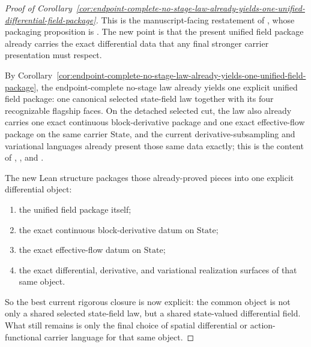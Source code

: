 \begin{proof}[Proof of Corollary~\ref{cor:endpoint-complete-no-stage-law-already-yields-one-unified-differential-field-package}]
\label{proof:cor:endpoint-complete-no-stage-law-already-yields-one-unified-differential-field-package}
This is the manuscript-facing restatement of
,
whose packaging proposition is
. The new point is that
the present unified field package already carries the exact differential data
that any final stronger carrier presentation must respect.

By Corollary~\ref{cor:endpoint-complete-no-stage-law-already-yields-one-unified-field-package},
the endpoint-complete no-stage law already yields one explicit unified field
package: one canonical selected state-field law together with its four
recognizable flagship faces. On the detached selected cut, the law also
already carries one exact continuous block-derivative package and one exact
effective-flow package on the same carrier \(\mathrm{State}\), and the current
derivative-subsampling and variational languages already present those same
data exactly; this is the content of
,
,
and
.

The new Lean structure  packages
those already-proved pieces into one explicit differential object:
\begin{enumerate}[label=(\roman*), leftmargin=2em, itemsep=0.2em]
\item the unified field package itself;
\item the exact continuous block-derivative datum on \(\mathrm{State}\);
\item the exact effective-flow datum on \(\mathrm{State}\);
\item the exact differential, derivative, and variational realization
      surfaces of that same object.
\end{enumerate}
So the best current rigorous closure is now explicit: the common object is not
only a shared selected state-field law, but a shared state-valued differential
field. What still remains is only the final choice of spatial differential or
action-functional carrier language for that same object.
\end{proof}

